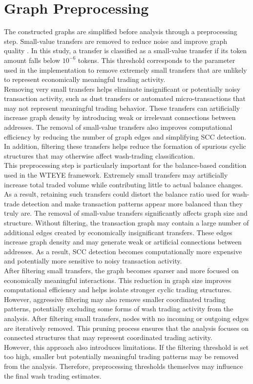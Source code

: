 \documentclass[language=english,thesis=bachelor,nosecondtitle,faculty=cb,onesided,13pt]{hsmw-thesis}
\begin{document}
	\section{Graph Preprocessing}
The constructed graphs are simplified before analysis through a preprocessing step. Small-value transfers are removed to reduce noise and improve graph quality \cite{cui2023chain}. In this study, a transfer is classified as a small-value transfer if its token amount falls below $10^{-6}$ tokens. This threshold corresponds to the parameter used in the implementation to remove extremely small transfers that are unlikely to represent economically meaningful trading activity.\\
Removing very small transfers helps eliminate insignificant or potentially noisy transaction activity, such as dust transfers or automated micro-transactions that may not represent meaningful trading behavior. These transfers can artificially increase graph density by introducing weak or irrelevant connections between addresses.
The removal of small-value transfers also improves computational efficiency by reducing the number of graph edges and simplifying SCC detection. In addition, filtering these transfers helps reduce the formation of spurious cyclic structures that may otherwise affect wash-trading classification.\\
This preprocessing step is particularly important for the balance-based condition used in the WTEYE framework. Extremely small transfers may artificially increase total traded volume while contributing little to actual balance changes. As a result, retaining such transfers could distort the balance ratio used for wash-trade detection and make transaction patterns appear more balanced than they truly are.
The removal of small-value transfers significantly affects graph size and structure. Without filtering, the transaction graph may contain a large number of additional edges created by economically insignificant transfers. These edges increase graph density and may generate weak or artificial connections between addresses. As a result, SCC detection becomes computationally more expensive and potentially more sensitive to noisy transaction activity.\\
After filtering small transfers, the graph becomes sparser and more focused on economically meaningful interactions. This reduction in graph size improves computational efficiency and helps isolate stronger cyclic trading structures. However, aggressive filtering may also remove smaller coordinated trading patterns, potentially excluding some forms of wash trading activity from the analysis.
After filtering small transfers, nodes with no incoming or outgoing edges are iteratively removed. This pruning process ensures that the analysis focuses on connected structures that may represent coordinated trading activity.\\
However, this approach also introduces limitations. If the filtering threshold is set too high, smaller but potentially meaningful trading patterns may be removed from the analysis. Therefore, preprocessing thresholds themselves may influence the final wash trading estimates.\\
\end{document}
